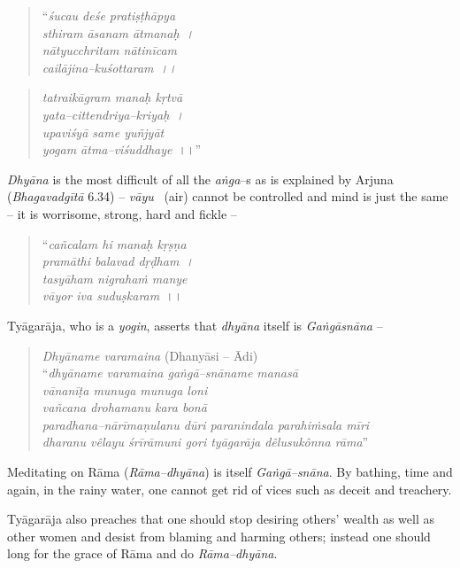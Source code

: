 \begin{verse}
“\textit{śucau deśe pratiṣṭhāpya}\\\textit{sthiram āsanam ātmanaḥ~।}\\\textit{nātyucchritam nātinīcam}\\\textit{cailājina–kuśottaram~।।}
\end{verse}

\begin{verse}
\textit{tatraikāgram manaḥ kṛtvā}\\\textit{yata–cittendriya–kriyaḥ~।}\\\textit{upaviśyā same yuñjyāt}\\\textit{yogam ātma–viśuddhaye}~।।”
\end{verse}

\textit{Dhyāna} is the most difficult of all the \textit{aṅga}–s as is explained by Arjuna (\textit{Bhagavadgītā} 6.34) – \textit{vāyu}  (air) cannot be controlled and mind is just the same – it is worrisome, strong, hard and fickle –

\begin{verse}
“\textit{cañcalam hi manaḥ kṛṣṇa}\\\textit{pramāthi balavad dṛḍham~।}\\\textit{tasyāham nigrahaṁ manye}\\\textit{vāyor iva suduṣkaram}~।।
\end{verse}

Tyāgarāja, who is a \textit{yogin}, asserts that \textit{dhyāna} itself is \textit{Gaṅgāsnāna} –

\begin{verse}
\textit{Dhyāname varamaina} (Dhanyāsi – Ādi)\\ “\textit{dhyāname varamaina gaṅgā–snāname manasā}\\\textit{vānanīṭa munuga munuga loni} \\\textit{vañcana drohamanu kara bonā}\\\textit{paradhana–nārīmaṇulanu dūri paranindala parahiṁsala mīri}\\\textit{dharanu vêlayu śrīrāmuni gori tyāgarāja dêlusukônna rāma}”
\end{verse}

Meditating on Rāma (\textit{Rāma–dhyāna}) is itself \textit{Gaṅgā–snāna}. By bathing, time and again, in the rainy water, one cannot get rid of vices such as deceit and treachery. 

Tyāgarāja also preaches that one should stop desiring others’ wealth as well as other women and desist from blaming and harming others; instead one should long for the grace of Rāma and do \textit{Rāma–dhyāna}.


